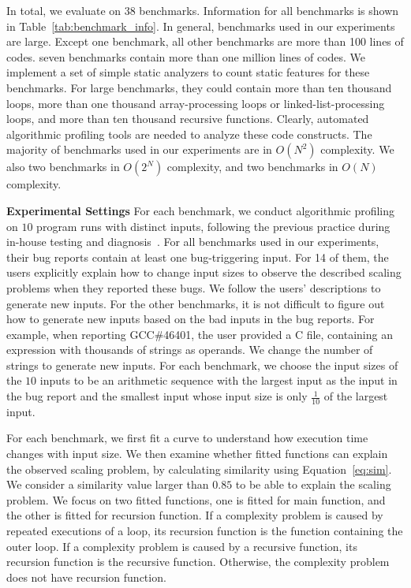 In total, we evaluate \Tool on 38 benchmarks. 
Information for all benchmarks is shown in Table~\ref{tab:benchmark_info}.
In general, benchmarks used in our experiments are large. 
Except one benchmark, all other benchmarks are more than 100 lines of codes. 
seven benchmarks contain more than one million lines of codes. 
We implement a set of simple static analyzers to count static features for these benchmarks. 
For large benchmarks, 
they could contain more than ten thousand loops, more than one 
thousand array-processing loops or linked-list-processing loops, 
and more than ten thousand recursive functions. 
Clearly, automated algorithmic profiling tools are needed to analyze these code constructs. 
The majority of benchmarks used in our experiments are in $O(N^2)$ complexity. 
We also two benchmarks in $O(2^N)$ complexity, and two benchmarks in $O(N)$ complexity. 



\textbf{Experimental Settings}
For each benchmark, 
we conduct algorithmic profiling on $10$ program runs with distinct inputs, 
following the previous practice during in-house 
testing and diagnosis~\cite{SongOOPSLA2014,joy.asplos13}.
For all benchmarks used in our experiments,
their bug reports contain at least one bug-triggering input. 
For 14 of them, 
the users explicitly explain how to change input sizes to 
observe the described scaling problems when they reported these bugs. 
We follow the users' 
descriptions to generate new inputs.
For the other benchmarks, 
it is not difficult to figure out how to generate new inputs based 
on the bad inputs in the bug reports. 
For example, when reporting GCC\#46401, 
the user provided a C file, 
containing an expression with thousands of strings as operands. 
We change the number of strings to generate new inputs.
For each benchmark, we choose the input sizes of the $10$ inputs to be 
an arithmetic sequence with the largest input as the input in the bug report 
and the smallest input whose input size is 
only $\frac{1}{10}$ of the largest input.

For each benchmark, we first fit a curve to understand how execution 
time changes with input size. 
We then examine whether fitted functions can explain the observed scaling problem, 
by calculating similarity using Equation~\ref{eq:sim}. 
We consider a similarity value larger than $0.85$ to be able to explain the scaling problem. 
We focus on two fitted functions, one is fitted for main function, 
and the other is fitted for recursion function. 
If a complexity problem is caused by repeated executions of a loop,
its recursion function is the function containing the outer loop.
If a complexity problem is caused by a recursive function, 
its recursion function is the recursive function. 
Otherwise, the complexity problem does not have recursion function. 

